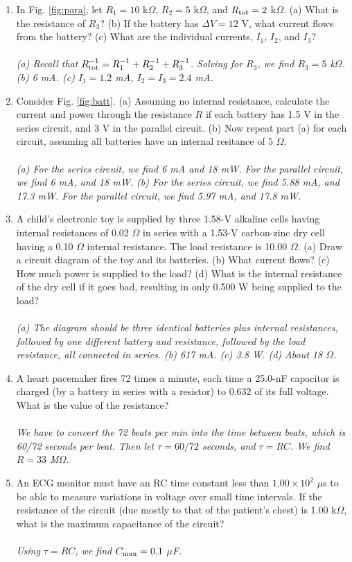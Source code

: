 \documentclass[12pt,twocolumn]{article}
\begin{document}
\begin{enumerate}
\item In Fig. \ref{fig:para}, let $R_1 = 10$ k$\Omega$, $R_2 = 5$ k$\Omega$, and $R_{\rm tot} = 2$ k$\Omega$.  (a) What is the resistance of $R_3$? (b) If the battery has $\Delta V = 12$ V, what current flows from the battery? (c) What are the individual currents, $I_1$, $I_2$, and $I_3$? \\ \\
\textit{(a) Recall that $R_{\rm tot}^{-1} = R_{1}^{-1} + R_2^{-1} + R_3^{-1}$.  Solving for $R_3$, we find $R_3 = 5$ k$\Omega$. (b) 6 mA.  (c) $I_1 = 1.2$ mA, $I_2 = I_3 = 2.4$ mA.}
\item Consider Fig. \ref{fig:batt}. (a) Assuming no internal resistance, calculate the current and power through the resistance $R$ if each battery has 1.5 V in the series circuit, and 3 V in the parallel circuit. (b) Now repeat part (a) for each circuit, assuming all batteries have an internal resitance of $5$ $\Omega$. \\ \\
\textit{(a) For the series circuit, we find 6 mA and 18 mW.  For the parallel circuit, we find 6 mA, and 18 mW. (b) For the series circuit, we find 5.88 mA, and 17.3 mW.  For the parallel circuit, we find 5.97 mA, and 17.8 mW.}
\item A child's electronic toy is supplied by three 1.58-V alkaline cells having internal resistances of 0.02 $\Omega$ in series with a 1.53-V carbon-zinc dry cell having a 0.10 $\Omega$ internal resistance. The load resistance is 10.00 $\Omega$. (a) Draw a circuit diagram of the toy and its batteries. (b) What current flows? (c) How much power is supplied to the load? (d) What is the internal resistance of the dry cell if it goes bad, resulting in only 0.500 W being supplied to the load? \\ \\
\textit{(a) The diagram should be three identical batteries plus internal resistances, followed by one different battery and resistance, followed by the load resistance, all connected in series. (b) 617 mA.  (c) 3.8 W.  (d) About 18 $\Omega$.}
\item A heart pacemaker fires 72 times a minute, each time a 25.0-nF capacitor is charged (by a battery in series with a resistor) to 0.632 of its full voltage. What is the value of the resistance? \\ \\
\textit{We have to convert the 72 beats per min into the time between beats, which is 60/72 seconds per beat.  Then let $\tau = 60/72$ seconds, and $\tau = RC$.  We find $R = 33$ M$\Omega$.}
\item An ECG monitor must have an RC time constant less than $1.00 \times 10^2$ $\mu$s to be able to measure variations in voltage over small time intervals. If the resistance of the circuit (due mostly to that of the patient’s chest) is 1.00 k$\Omega$, what is the maximum capacitance of the circuit? \\ \\
\textit{Using $\tau = RC$, we find $C_{\rm max} = 0.1$ $\mu$F.}
\end{enumerate}
\end{document}
